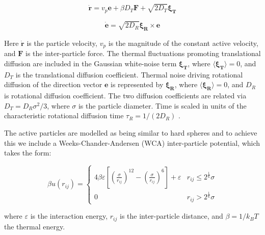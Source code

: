 \begin{equation}
    \dot{\mathbf{r}}=v_{p} \mathbf{e}+\beta D_{T}\mathbf{F} +\sqrt{2D_{T}}\boldsymbol{\xi_T}
    \label{eq:Eom1}
\end{equation}


\begin{equation}
    \dot{\mathbf{e}}=\sqrt{2D_{R}}\boldsymbol{\xi_R} \times \mathbf{e}
    \label{eq:Eom2}
\end{equation}


\noindent
Here $\dot{\mathbf{r}}$ is the particle velocity, $v_p$ is the magnitude of the constant active velocity, and $\boldsymbol{F}$ is the inter-particle force. The thermal fluctuations promoting translational diffusion are included in the Gaussian white-noise term
$\boldsymbol{\xi_T}$, where $\langle\boldsymbol{\xi_T}\rangle=0$, and $D_{T}$ is the translational diffusion coefficient. Thermal noise driving rotational diffusion of the direction vector $\boldsymbol{e}$ is represented by $\boldsymbol{\xi_R}$,  where $\langle\boldsymbol{\xi_R}\rangle=0$, and $D_{R}$ is rotational diffusion coefficient. The two diffusion coefficients are related via $D_{T} = D_{R}\sigma^{2}/3$, where $\sigma$ is the particle diameter. Time is scaled in units of the characteristic rotational diffusion time $\tau_R = 1 / (2D_R)$ \cite{wysocki2014}. 


The active particles are modelled as being similar to hard spheres and to achieve this we include a Weeks-Chander-Andersen (WCA) inter-particle potential, which takes the form:


\begin{equation}
\beta u(r_{ij}) = \begin{cases}
4 \beta \varepsilon\left[\left(\frac{\sigma}{r_{ij}}\right)^{12} - \left(\frac{\sigma}{r_{ij}}\right)^{6}\right] + \varepsilon & r_{ij} \leq 2^{\frac{1}{6}}\sigma \\%
0 & r_{ij} > 2^{\frac{1}{6}}\sigma   
\end{cases}
\label{eq:WCA}
\end{equation}


\noindent
where $\varepsilon$ is the interaction energy, $r_{ij}$ is the inter-particle distance, and $\beta=1/k_BT$ the thermal energy. 


